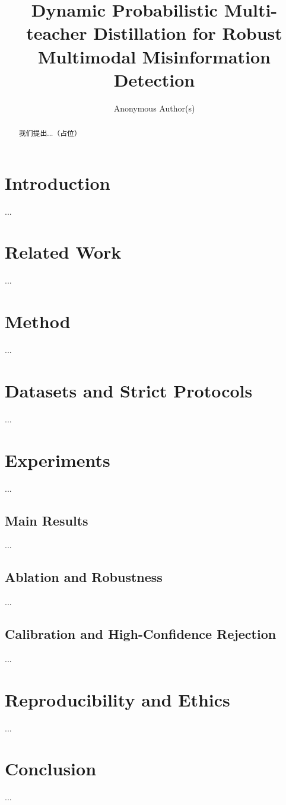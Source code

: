 \documentclass[sigconf,anonymous,review]{acmart}
\begin{document}
\title{Dynamic Probabilistic Multi-teacher Distillation for Robust Multimodal Misinformation Detection}\author{Anonymous Author(s)}\affiliation{~}\begin{abstract}我们提出...（占位）\end{abstract}\maketitle\section{Introduction}...\section{Related Work}...\section{Method}...\section{Datasets and Strict Protocols}...\section{Experiments}...\subsection{Main Results}...\subsection{Ablation and Robustness}...\subsection{Calibration and High-Confidence Rejection}...\section{Reproducibility and Ethics}...\section{Conclusion}...
\end{document}
